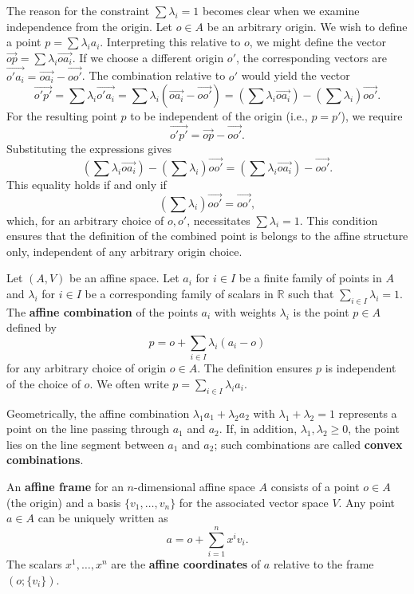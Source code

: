 The reason for the constraint $\sum \lambda_i = 1$ becomes clear when we examine independence from the origin. Let $o \in A$ be an arbitrary origin. We wish to define a point $p = \sum \lambda_i a_i$. Interpreting this relative to $o$, we might define the vector $\vec{op} = \sum \lambda_i \vec{oa_i}$. If we choose a different origin $o'$, the corresponding vectors are $\vec{o'a_i} = \vec{oa_i} - \vec{oo'}$. The combination relative to $o'$ would yield the vector
\[
\vec{o'p'} = \sum \lambda_i \vec{o'a_i} = \sum \lambda_i (\vec{oa_i} - \vec{oo'}) = \left( \sum \lambda_i \vec{oa_i} \right) - \left( \sum \lambda_i \right) \vec{oo'}.
\]
For the resulting point $p$ to be independent of the origin (i.e., $p = p'$), we require
\[
\vec{o'p'} = \vec{op} - \vec{oo'}.
\]
Substituting the expressions gives
\[
\left( \sum \lambda_i \vec{oa_i} \right) - \left( \sum \lambda_i \right) \vec{oo'} = \left( \sum \lambda_i \vec{oa_i} \right) - \vec{oo'}.
\]
This equality holds if and only if
\[
\left( \sum \lambda_i \right) \vec{oo'} = \vec{oo'},
\]
which, for an arbitrary choice of $o, o'$, necessitates $\sum \lambda_i = 1$. This condition ensures that the definition of the combined point is belongs to the affine structure only, independent of any arbitrary origin choice.

\begin{definition}
Let $(A, V)$ be an affine space. Let $a_i$ for $i \in I$ be a finite family of points in $A$ and $\lambda_i$ for $i \in I$ be a corresponding family of scalars in $\mathbb{R}$ such that $\sum_{i \in I} \lambda_i = 1$. The \textbf{affine combination} of the points $a_i$ with weights $\lambda_i$ is the point $p \in A$ defined by
\[
p = o + \sum_{i \in I} \lambda_i (a_i - o)
\]
for any arbitrary choice of origin $o \in A$. The definition ensures $p$ is independent of the choice of $o$. We often write $p = \sum_{i \in I} \lambda_i a_i$.
\end{definition}

Geometrically, the affine combination $\lambda_1 a_1 + \lambda_2 a_2$ with $\lambda_1 + \lambda_2 = 1$ represents a point on the line passing through $a_1$ and $a_2$. If, in addition, $\lambda_1, \lambda_2 \geq 0$, the point lies on the line segment between $a_1$ and $a_2$; such combinations are called \textbf{convex combinations}.

\begin{definition}
    An \textbf{affine frame} for an $n$-dimensional affine space $A$ consists of a point $o \in A$ (the origin) and a basis $\{ v_1, \dots, v_n \}$ for the associated vector space $V$. Any point $a \in A$ can be uniquely written as
\[
a = o + \sum_{i=1}^n x^i v_i.
\]
The scalars $x^1, \dots, x^n$ are the \textbf{affine coordinates} of $a$ relative to the frame $(o; \{ v_i \})$.
\end{definition}


